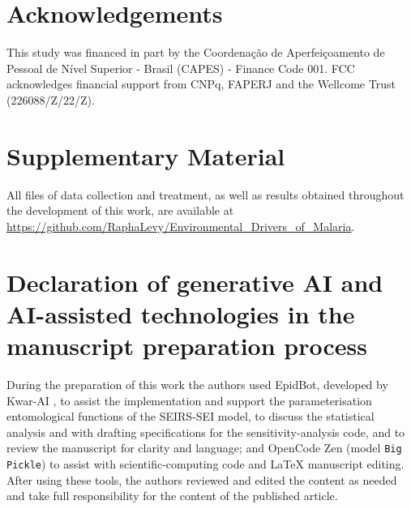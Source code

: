 \documentclass[a4paper,fleqn]{cas-dc}
\begin{document}
\section*{Acknowledgements}
\label{sec:acknowledgements}
This study was financed in part by the Coordenação de Aperfeiçoamento de Pessoal de Nível Superior - Brasil (CAPES) - Finance Code 001. FCC acknowledges financial support from CNPq, FAPERJ and the Wellcome Trust (226088/Z/22/Z).

\section*{Supplementary Material}
\label{sec:supplementary_material}
All files of data collection and treatment, as well as results obtained throughout the development of this work, are available at \url{https://github.com/RaphaLevy/Environmental_Drivers_of_Malaria}. 

\section*{Declaration of generative AI and AI-assisted technologies in the manuscript preparation process}
\label{sec:gen_ai_use}
During the preparation of this work the authors used EpidBot, developed by Kwar-AI \cite{epidbot}, to assist the implementation and support the parameterisation entomological functions of the SEIRS-SEI model, to discuss the statistical analysis and with drafting
specifications for the sensitivity-analysis code, and to review the manuscript for clarity and language; and OpenCode Zen (model \texttt{Big Pickle}) to assist with scientific-computing code and LaTeX manuscript editing. After using these tools, the authors reviewed and edited the content as needed and take full responsibility for the content of the published article.
\end{document}
